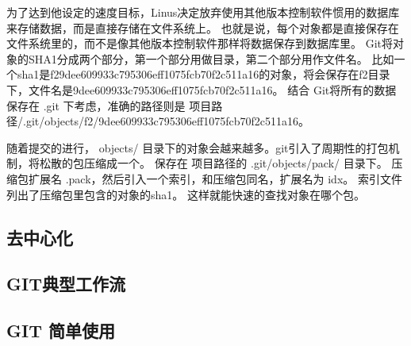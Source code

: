 为了达到他设定的速度目标，Linus决定放弃使用其他版本控制软件惯用的数据库来存储数据，而是直接存储在文件系统上。
也就是说，每个对象都是直接保存在文件系统里的，而不是像其他版本控制软件那样将数据保存到数据库里。
Git将对象的SHA1分成两个部分，第一个部分用做目录，第二个部分用作文件名。
比如一个sha1是f29dee609933c795306eff1075fcb70f2c511a16的对象，将会保存在f2目录下，文件名是9dee609933c795306eff1075fcb70f2c511a16。
结合 Git将所有的数据保存在 .git 下考虑，准确的路径则是 项目路径/.git/objects/f2/9dee609933c795306eff1075fcb70f2c511a16。

随着提交的进行， objects/ 目录下的对象会越来越多。git引入了周期性的打包机制，将松散的包压缩成一个。
保存在 项目路径的 .git/objects/pack/ 目录下。
压缩包扩展名 .pack，然后引入一个索引，和压缩包同名，扩展名为 idx。
索引文件列出了压缩包里包含的对象的sha1。
这样就能快速的查找对象在哪个包。

\subsection{去中心化}
\subsection{GIT典型工作流}
\subsection{GIT 简单使用}



